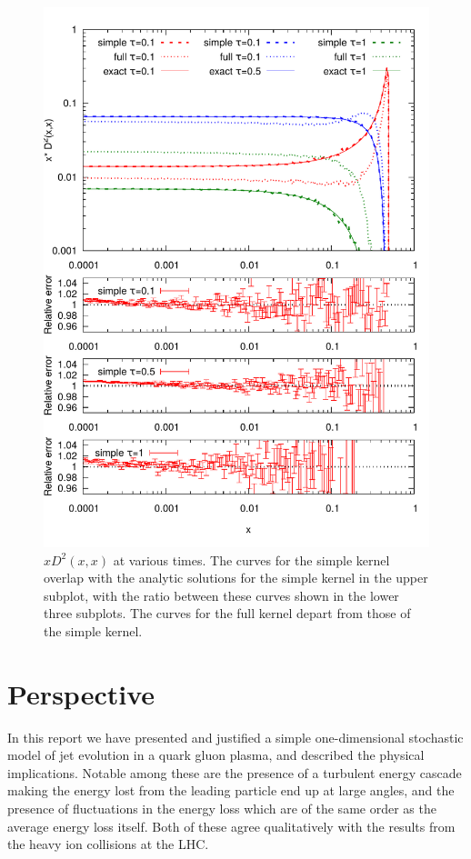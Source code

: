 \documentclass[a4paper,12pt]{article}
\numberwithin{equation}{section}
\begin{document}
\begin{figure}
\centering
\includegraphics[width=0.9\linewidth]{D2.pdf}
\vspace*{-20pt}
\caption{$x D^2(x,x)$ at various times. The curves for the simple kernel overlap with the analytic solutions for the simple kernel in the upper subplot, with the ratio between these curves shown in the lower three subplots. The curves for the full kernel depart from those of the simple kernel.}\label{D2times}
\end{figure}


\section{Perspective}\label{perspective}
In this report we have presented and justified a simple one-dimensional stochastic model of jet evolution in a quark gluon plasma, and described the physical implications. Notable among these are the presence of a turbulent energy cascade making the energy lost from the leading particle end up at large angles, and the presence of fluctuations in the energy loss which are of the same order as the average energy loss itself. Both of these agree qualitatively with the results from the heavy ion collisions at the LHC.
\end{document}

